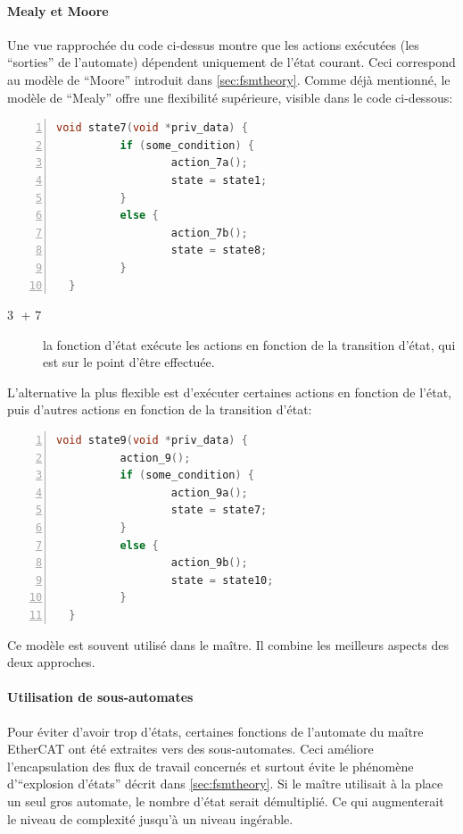 \documentclass[a4paper,12pt,BCOR6mm,bibtotoc,idxtotoc]{scrbook}
\newcommand{\linenum}[1]{\normalfont\textcircled{\tiny #1}}
\begin{document}
\paragraph{Mealy et Moore}

Une vue rapproch\'ee du code ci-dessus montre que les actions ex\'ecut\'ees
(les ``sorties'' de l'automate) d\'ependent uniquement de l'\'etat
courant.  Ceci correspond au mod\`ele de ``Moore'' introduit dans
\autoref{sec:fsmtheory}.  Comme d\'ej\`a mentionn\'e, le mod\`ele de ``Mealy''
offre une flexibilit\'e sup\'erieure, visible dans le code
ci-dessous:

\begin{lstlisting}[gobble=2,language=C,numbers=left]
  void state7(void *priv_data) {
          if (some_condition) {
                  action_7a();
                  state = state1;
          }
          else {
                  action_7b();
                  state = state8;
          }
  }
\end{lstlisting}

\begin{description}

\item[\linenum{3} + \linenum{7}] la fonction d'\'etat ex\'ecute les
  actions en fonction de la transition d'\'etat, qui est sur le point
  d'\^etre effectu\'ee.

\end{description}

L'alternative la plus flexible est d'ex\'ecuter certaines actions en
fonction de l'\'etat, puis d'autres actions en fonction de la
transition d'\'etat:

\begin{lstlisting}[gobble=2,language=C,numbers=left]
  void state9(void *priv_data) {
          action_9();
          if (some_condition) {
                  action_9a();
                  state = state7;
          }
          else {
                  action_9b();
                  state = state10;
          }
  }
\end{lstlisting}

Ce mod\`ele est souvent utilis\'e dans le ma\^itre. Il combine les
meilleurs aspects des deux approches.

\paragraph{Utilisation de sous-automates}

Pour \'eviter d'avoir trop d'\'etats, certaines fonctions de l'automate du
ma\^itre EtherCAT ont \'et\'e extraites vers des sous-automates.  Ceci
am\'eliore l'encapsulation des flux de travail concern\'es et surtout
\'evite le ph\'enom\`ene d'``explosion d'\'etats'' d\'ecrit dans
\autoref{sec:fsmtheory}. Si le ma\^itre utilisait \`a la place un seul
gros automate, le nombre d'\'etat serait d\'emultipli\'e. Ce qui
augmenterait le niveau de complexit\'e jusqu'\`a un niveau ing\'erable.
\end{document}
